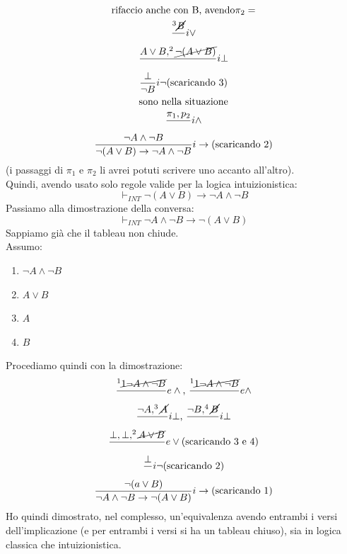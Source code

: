 \documentclass[a4paper,12pt, oneside]{book}
\begin{document}
\begin{esempio}
\begin{gather*}
    \mbox{rifaccio anche con B, avendo} \pi_2=\\
    \frac{ ^3\cancel{B}}{}i\lor\\
    \frac{A\lor B, ^2\cancel{\neg(A\lor B)}}{}i\bot\\
    \frac{\bot}{\neg B}i\neg\mbox{(scaricando 3)}\\
    \mbox{sono nella situazione}\\
    \frac{\pi_1, p_2}{}i\land\\
    \frac{\neg A \land \neg B}{\neg(A\lor B)\to \neg A\land \neg
      B}i\to\mbox{(scaricando 2)}  
  \end{gather*}
  (i passaggi di $\pi_1$ e $\pi_2$ li avrei potuti scrivere uno accanto
  all'altro). \\
  Quindi, avendo usato solo regole valide per la logica intuizionistica:
  \[\vdash_{INT}\neg(A\lor B)\to \neg A\land \neg B\]
  Passiamo alla dimostrazione della conversa:
 \[\vdash_{INT}\neg A\land \neg B\to\neg(A\lor B)\]
 Sappiamo già che il tableau non chiude.\\
 Assumo:
 \begin{enumerate}
   \item $\neg A\land \neg B$
   \item $A\lor B$
   \item $A$
   \item $B$
 \end{enumerate}
 Procediamo quindi con la dimostrazione:
 \begin{gather*}
   \frac{^1\cancel{1\neg A\land \neg B}}{}e\land\mbox{, }\frac{^1\cancel{1\neg
         A\land \neg B}}{}e\land\\ 
   \frac{\neg A, ^3 \cancel{A}}{}i\bot\mbox{, }\frac{\neg B,
     ^4\cancel{B}}{}i\bot\\  
   \frac{\bot,\bot,^2\cancel{A\lor B}}{}e\lor\mbox{(scaricando 3 e 4)}\\
   \frac{\bot}{}i\neg\mbox{(scaricando 2)}\\
   \frac{\neg(a\lor B)}{\neg A\land \neg B\to\neg(A\lor B)}i\to\mbox{(scaricando
     1)} 
 \end{gather*}
 Ho quindi dimostrato, nel complesso, un'equivalenza avendo entrambi i versi
 dell'implicazione (e per entrambi i versi si ha un tableau chiuso), sia in
 logica classica che intuizionistica.  
\end{esempio}
\end{document}
